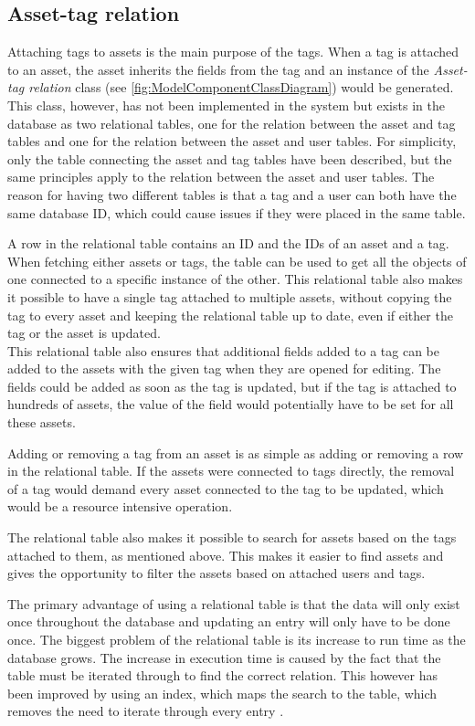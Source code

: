 \subsection{Asset-tag relation}
Attaching tags to assets is the main purpose of the tags. When a tag is attached to an asset, the asset inherits the fields from the tag and an instance of the \textit{Asset-tag relation} class (see \autoref{fig:ModelComponentClassDiagram}) would be generated. This class, however, has not been implemented in the system but exists in the database as two relational tables, one for the relation between the asset and tag tables and one for the relation between the asset and user tables. For simplicity, only the table connecting the asset and tag tables have been described, but the same principles apply to the relation between the asset and user tables. The reason for having two different tables is that a tag and a user can both have the same database ID, which could cause issues if they were placed in the same table.
\par
A row in the relational table contains an ID and the IDs of an asset and a tag. When fetching either assets or tags, the table can be used to get all the objects of one connected to a specific instance of the other. This relational table also makes it possible to have a single tag attached to multiple assets, without copying the tag to every asset and keeping the relational table up to date, even if either the tag or the asset is updated.
\\
This relational table also ensures that additional fields added to a tag can be added to the assets with the given tag when they are opened for editing. The fields could be added as soon as the tag is updated, but if the tag is attached to hundreds of assets, the value of the field would potentially have to be set for all these assets.
\par
Adding or removing a tag from an asset is as simple as adding or removing a row in the relational table. If the assets were connected to tags directly, the removal of a tag would demand every asset connected to the tag to be updated, which would be a resource intensive operation.
\par
The relational table also makes it possible to search for assets based on the tags attached to them, as mentioned above. This makes it easier to find assets and gives the opportunity to filter the assets based on attached users and tags.
\par
The primary advantage of using a relational table is that the data will only exist once throughout the database and updating an entry will only have to be done once. The biggest problem of the relational table is its increase to run time as the database grows. The increase in execution time is caused by the fact that the table must be iterated through to find the correct relation. This however has been improved by using an index, which maps the search to the table, which removes the need to iterate through every entry \citep{RelationalTable}.
